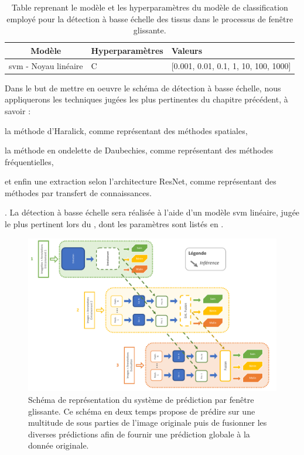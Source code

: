 \begin{table}[H]
    \centering
    \begin{tabular}{cll}
        \toprule
        \textbf{Modèle}                                 & \textbf{Hyperparamètres}  & \textbf{Valeurs}                          \\ \midrule
        \gls{svm} - Noyau linéaire                      & C                         & [0.001, 0.01, 0.1, 1, 10, 100, 1000]      \\ 
        \bottomrule 
    \end{tabular} 
    \caption{Table reprenant le modèle et les hyperparamètres du modèle de classification employé pour la détection à basse échelle des tissus dans le processus de fenêtre glissante.}
    \label{tab:sliding_window_models}
\end{table}\par

Dans le but de mettre en oeuvre le schéma de détection à basse échelle, nous appliquerons les techniques jugées les plus pertinentes du chapitre précédent, à savoir : 
\begin{inlinerate}
    \item la méthode d'Haralick, comme représentant des méthodes spatiales,
    \item la méthode en ondelette de Daubechies, comme représentant des méthodes fréquentielles,
    \item et enfin une extraction selon l'architecture ResNet, comme représentant des méthodes par transfert de connaissances.
\end{inlinerate}. La détection à basse échelle sera réalisée à l'aide d'un modèle \gls{svm} linéaire, jugée le plus pertinent lors du , dont les paramètres sont listés en .\par

\begin{figure}[H]
    \centering
    \includegraphics[width=\linewidth]{contents/chapter_5/resources/scheme_sliding_features.pdf}
    \caption{Schéma de représentation du système de prédiction par fenêtre glissante. Ce schéma en deux temps propose de prédire sur une multitude de sous parties de l'image originale puis de fusionner les diverses prédictions afin de fournir une prédiction globale à la donnée originale.}
    \label{fig:scheme_sliding_features}
\end{figure}\par

